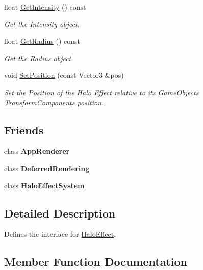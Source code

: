 \begin{DoxyCompactItemize}
float \hyperlink{classHaloEffect_a84a3c6b6053f6f4e5215db8113e752c5}{Get\+Intensity} () const
\begin{DoxyCompactList}\small\item\em Get the Intensity object. \end{DoxyCompactList}\item 
float \hyperlink{classHaloEffect_a408bdc91b45f3162f05901f46db1bf86}{Get\+Radius} () const
\begin{DoxyCompactList}\small\item\em Get the Radius object. \end{DoxyCompactList}\item 
void \hyperlink{classHaloEffect_ac18176eaf288934834aa0af6c80b0b53}{Set\+Position} (const Vector3 \&pos)
\begin{DoxyCompactList}\small\item\em Set the Position of the Halo Effect relative to its \hyperlink{classGameObject}{Game\+Object}\textquotesingle{}s \hyperlink{classTransformComponent}{Transform\+Component}\textquotesingle{}s position. \end{DoxyCompactList}\end{DoxyCompactItemize}
\subsection*{Friends}
\begin{DoxyCompactItemize}
\item 
\mbox{\label{classHaloEffect_a5f3d064e51c4a3bf9409801632b9a7af}} 
class {\bfseries App\+Renderer}
\item 
\mbox{\label{classHaloEffect_a355bf32616f2e1751ee46bd315e905e5}} 
class {\bfseries Deferred\+Rendering}
\item 
\mbox{\label{classHaloEffect_a48ea1f3f3b0f91b58f6ccda709a96f69}} 
class {\bfseries Halo\+Effect\+System}
\end{DoxyCompactItemize}


\subsection{Detailed Description}
Defines the interface for \hyperlink{classHaloEffect}{Halo\+Effect}. 

\subsection{Member Function Documentation}
\mbox{\label{classHaloEffect_a103a5a12331c33b197a410292cddd341}} 
